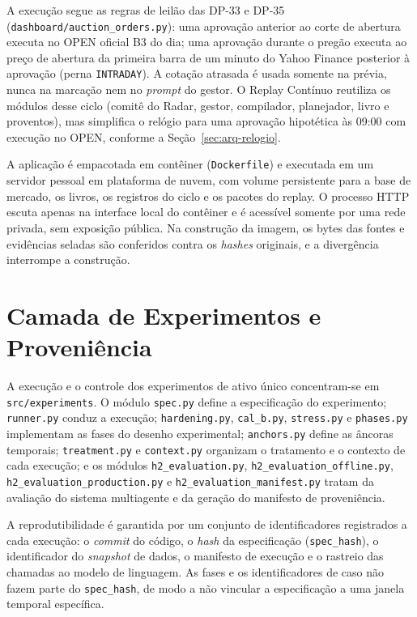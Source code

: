 A execução segue as regras de leilão das DP-33 e DP-35 (\texttt{dashboard/auction\_orders.py}): uma aprovação anterior ao corte de abertura executa no OPEN oficial B3 do dia; uma aprovação durante o pregão executa ao preço de abertura da primeira barra de um minuto do Yahoo Finance posterior à aprovação (perna \texttt{INTRADAY}). A cotação atrasada é usada somente na prévia, nunca na marcação nem no \textit{prompt} do gestor. O Replay Contínuo reutiliza os módulos desse ciclo (comitê do Radar, gestor, compilador, planejador, livro e proventos), mas simplifica o relógio para uma aprovação hipotética às 09:00 com execução no OPEN, conforme a Seção~\ref{sec:arq-relogio}.

A aplicação é empacotada em contêiner (\texttt{Dockerfile}) e executada em um servidor pessoal em plataforma de nuvem, com volume persistente para a base de mercado, os livros, os registros do ciclo e os pacotes do replay. O processo HTTP escuta apenas na interface local do contêiner e é acessível somente por uma rede privada, sem exposição pública. Na construção da imagem, os bytes das fontes e evidências seladas são conferidos contra os \textit{hashes} originais, e a divergência interrompe a construção.

\section{Camada de Experimentos e Proveniência}
\label{sec:arq-experimentos}

A execução e o controle dos experimentos de ativo único concentram-se em \texttt{src/experiments}. O módulo \texttt{spec.py} define a especificação do experimento; \texttt{runner.py} conduz a execução; \texttt{hardening.py}, \texttt{cal\_b.py}, \texttt{stress.py} e \texttt{phases.py} implementam as fases do desenho experimental; \texttt{anchors.py} define as âncoras temporais; \texttt{treatment.py} e \texttt{context.py} organizam o tratamento e o contexto de cada execução; e os módulos \texttt{h2\_evaluation.py}, \texttt{h2\_evaluation\_offline.py}, \texttt{h2\_evaluation\_production.py} e \texttt{h2\_evaluation\_manifest.py} tratam da avaliação do sistema multiagente e da geração do manifesto de proveniência.

A reprodutibilidade é garantida por um conjunto de identificadores registrados a cada execução: o \textit{commit} do código, o \textit{hash} da especificação (\texttt{spec\_hash}), o identificador do \textit{snapshot} de dados, o manifesto de execução e o rastreio das chamadas ao modelo de linguagem. As fases e os identificadores de caso não fazem parte do \texttt{spec\_hash}, de modo a não vincular a especificação a uma janela temporal específica.

